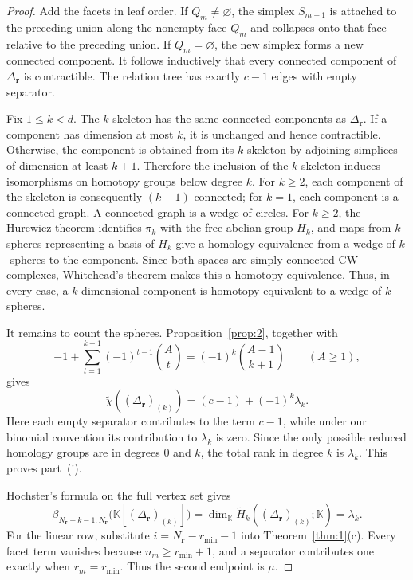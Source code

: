 \documentclass[10pt,a4paper]{amsart}
\newcommand{\K}{\mathbb K}
\newcommand{\SR}[1]{\K[#1]}
\begin{document}
	\begin{proof}
		Add the facets in leaf order. If $Q_m\ne\varnothing$, the simplex $S_{m+1}$ is attached to the preceding union along the nonempty face $Q_m$ and collapses onto that face relative to the preceding union. If $Q_m=\varnothing$, the new simplex forms a new connected component. It follows inductively that every connected component of $\Delta_{\mathbf r}$ is contractible. The relation tree has exactly $c-1$ edges with empty separator.
		
		Fix $1\le k<d$. The $k$-skeleton has the same connected components as $\Delta_{\mathbf r}$. If a component has dimension at most $k$, it is unchanged and hence contractible. Otherwise, the component is obtained from its $k$-skeleton by adjoining simplices of dimension at least $k+1$. Therefore the inclusion of the $k$-skeleton induces isomorphisms on homotopy groups below degree $k$. For $k\ge2$, each component of the skeleton is consequently $(k-1)$-connected; for $k=1$, each component is a connected graph. A connected graph is a wedge of circles. For $k\ge2$, the Hurewicz theorem identifies $\pi_k$ with the free abelian group $H_k$, and maps from $k$-spheres representing a basis of $H_k$ give a homology equivalence from a wedge of $k$-spheres to the component. Since both spaces are simply connected CW complexes, Whitehead's theorem makes this a homotopy equivalence. Thus, in every case, a $k$-dimensional component is homotopy equivalent to a wedge of $k$-spheres.
		
		It remains to count the spheres. Proposition~\ref{prop:2}, together with
		\[
		-1+\sum_{t=1}^{k+1}(-1)^{t-1}\binom At
		=(-1)^k\binom{A-1}{k+1}
		\qquad(A\ge1),
		\]
		gives
		\[
		\widetilde\chi((\Delta_{\mathbf r})_{(k)})
		=(c-1)+(-1)^k\lambda_k.
		\]
		Here each empty separator contributes to the term $c-1$, while under our binomial convention its contribution to $\lambda_k$ is zero. Since the only possible reduced homology groups are in degrees $0$ and $k$, the total rank in degree $k$ is $\lambda_k$. This proves part~(i).
		
		Hochster's formula on the full vertex set gives
		\[
		\beta_{N_{\mathbf r}-k-1,N_{\mathbf r}}
		\bigl(\SR{(\Delta_{\mathbf r})_{(k)}}\bigr)
		=\dim_{\K}\widetilde H_k((\Delta_{\mathbf r})_{(k)};\K)
		=\lambda_k.
		\]
		For the linear row, substitute $i=N_{\mathbf r}-r_{\min}-1$ into Theorem~\ref{thm:1}(c). Every facet term vanishes because $n_m\ge r_{\min}+1$, and a separator contributes one exactly when $r_m=r_{\min}$. Thus the second endpoint is $\mu$.
		

\end{proof}
\end{document}
